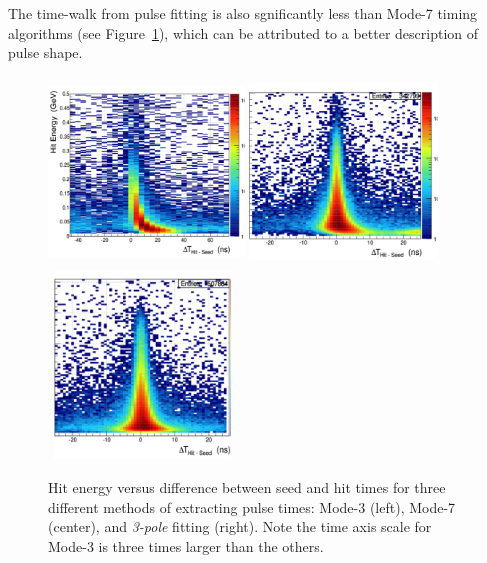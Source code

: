 \documentclass[amsmath,amssymb,notitlepage,12pt]{revtex4-1}
\begin{document}
  The time-walk from pulse fitting is also sgnificantly less than Mode-7 timing algorithms (see Figure~\ref{fig:timeWalk}), which can be attributed to a better description of pulse shape.
\begin{figure}[htbp]\centering
  \includegraphics[width=5.2cm,height=5cm]{pics/mode3tw.png}
  \includegraphics[width=5cm,height=5cm]{pics/mode7tw.png}
  \includegraphics[width=5cm,height=5cm]{pics/fittw.png}
  \caption{Hit energy versus difference between seed and hit times for three different methods of extracting pulse times:  Mode-3 (left), Mode-7 (center), and {\em 3-pole} fitting (right).  Note the time axis scale for Mode-3 is three times larger than the others.\label{fig:timeWalk}}
\end{figure}
\end{document}
